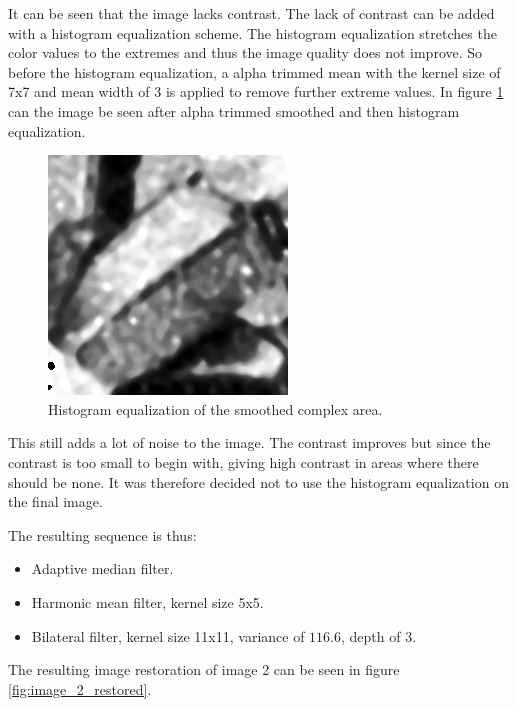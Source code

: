 It can be seen that the image lacks contrast.
The lack of contrast can be added with a histogram equalization scheme.
The histogram equalization stretches the color values to the extremes and thus the image quality does not improve.
So before the histogram equalization, a alpha trimmed mean with the kernel size of 7x7 and mean width of 3 is applied to remove further extreme values.
In figure \ref{fig:complex2_histeq_smoothed} can the image be seen after alpha trimmed smoothed and then histogram equalization.

\begin{figure}[H]
\centering
\includegraphics[width = \cutOutWidth]{graphics/complex2_histeq_smoothed.png}
\caption{Histogram equalization of the smoothed complex area.}
\label{fig:complex2_histeq_smoothed}
\end{figure}

This still adds a lot of noise to the image. 
The contrast improves but since the contrast is too small to begin with, giving high contrast in areas where there should be none.
It was therefore decided not to use the histogram equalization on the final image.

The resulting sequence is thus:
\begin{itemize}
 \item Adaptive median filter.
 \item Harmonic mean filter, kernel size 5x5.
 \item Bilateral filter, kernel size 11x11, variance of $116.6$, depth of 3.
\end{itemize}
The resulting image restoration of image 2 can be seen in figure \ref{fig:image_2_restored}.

